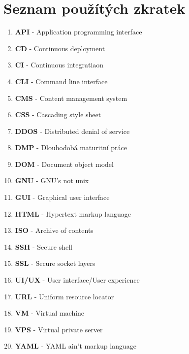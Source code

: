 \documentclass[12pt,a4paper]{report}
\begin{document}
  \section{Seznam použítých zkratek}
  \begin{enumerate}
    \item \textbf{API} - Application programming interface
    \item \textbf{CD} - Continuous deployment
    \item \textbf{CI} - Continuous integratiaon
    \item \textbf{CLI} - Command line interface
    \item \textbf{CMS} - Content management system
    \item \textbf{CSS} - Cascading style sheet
    \item \textbf{DDOS} - Distributed denial of service
    \item \textbf{DMP} - Dlouhodobá maturitní práce
    \item \textbf{DOM} - Document object model
    \item \textbf{GNU} - GNU's not unix
    \item \textbf{GUI} - Graphical user interface
    \item \textbf{HTML} - Hypertext markup language
    \item \textbf{ISO} - Archive of contents
    \item \textbf{SSH} - Secure shell
    \item \textbf{SSL}  - Secure socket layers
    \item \textbf{UI/UX} - User interface/User experience
    \item \textbf{URL} - Uniform resource locator
    \item \textbf{VM} - Virtual machine
    \item \textbf{VPS} - Virtual private server
    \item \textbf{YAML} - YAML ain't markup language
  
  \end{enumerate}

  
\end{document}
